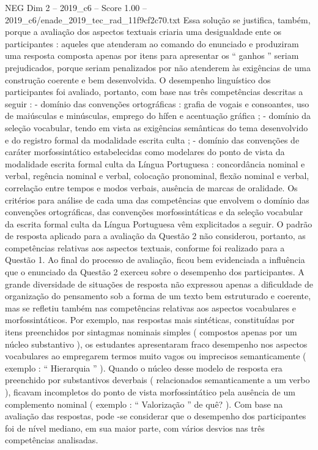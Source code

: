 \begin{textsample}{NEG Dim 2 – 2019\_c6 – Score 1.00 – 2019\_c6/enade\_2019\_tec\_rad\_11f9cf2c70.txt}
Essa solução se justifica, também, porque a avaliação dos aspectos textuais criaria uma desigualdade ente os participantes : aqueles que atenderam ao comando do enunciado e produziram uma resposta composta apenas por itens para apresentar os “ ganhos ” seriam prejudicados, porque seriam penalizados por não atenderem às exigências de uma construção coerente e bem desenvolvida.
O desempenho linguístico dos participantes foi avaliado, portanto, com base nas três competências descritas a seguir : - domínio das convenções ortográficas : grafia de vogais e consoantes, uso de maiúsculas e minúsculas, emprego do hífen e acentuação gráfica ; - domínio da seleção vocabular, tendo em vista as exigências semânticas do tema desenvolvido e do registro formal da modalidade escrita culta ; - domínio das convenções de caráter morfossintático estabelecidas como modelares do ponto de vista da modalidade escrita formal culta da Língua Portuguesa : concordância nominal e verbal, regência nominal e verbal, colocação pronominal, flexão nominal e verbal, correlação entre tempos e modos verbais, ausência de marcas de oralidade.
Os critérios para análise de cada uma das competências que envolvem o domínio das convenções ortográficas, das convenções morfossintáticas e da seleção vocabular da escrita formal culta da Língua Portuguesa vêm explicitados a seguir.
O padrão de resposta aplicado para a avaliação da Questão 2 não considerou, portanto, as competências relativas aos aspectos textuais, conforme foi realizado para a Questão 1.
Ao final do processo de avaliação, ficou bem evidenciada a influência que o enunciado da Questão 2 exerceu sobre o desempenho dos participantes.
A grande diversidade de situações de resposta não expressou apenas a dificuldade de organização do pensamento sob a forma de um texto bem estruturado e coerente, mas se refletiu também nas competências relativas aos aspectos vocabulares e morfossintáticos.
Por exemplo, nas respostas mais sintéticas, constituídas por itens preenchidos por sintagmas nominais simples ( compostos apenas por um núcleo substantivo ), os estudantes apresentaram fraco desempenho nos aspectos vocabulares ao empregarem termos muito vagos ou imprecisos semanticamente ( exemplo : “ Hierarquia ” ).
Quando o núcleo desse modelo de resposta era preenchido por substantivos deverbais ( relacionados semanticamente a um verbo ), ficavam incompletos do ponto de vista morfossintático pela ausência de um complemento nominal ( exemplo : “ Valorização ” de quê? ).
Com base na avaliação das respostas, pode -se considerar que o desempenho dos participantes foi de nível mediano, em sua maior parte, com vários desvios nas três competências analisadas.

\end{textsample}
